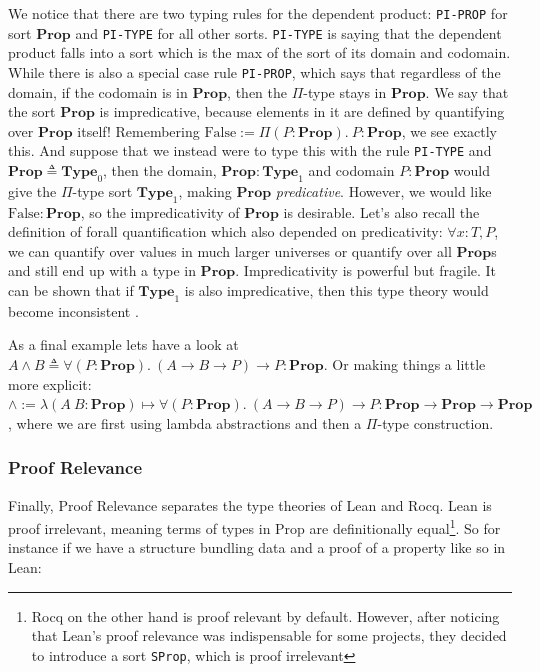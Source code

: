 We notice that there are two typing rules for the dependent product: \texttt{PI-PROP} for sort $\mathbf{Prop}$ and \texttt{PI-TYPE} for all other sorts. \texttt{PI-TYPE}
is saying that the dependent product falls into a sort which is the max of the sort of its domain and codomain. While there is also a special case rule
\texttt{PI-PROP}, which says that regardless of the domain, if the codomain is in $\mathbf{Prop}$, then the $\Pi$-type stays in $\mathbf{Prop}$.
We say that the sort $\mathbf{Prop}$ is impredicative, because elements in it are defined by quantifying over $\mathbf{Prop}$ itself! Remembering 
$\mathrm{False} := \Pi (P : \mathbf{Prop}).\ P : \mathbf{Prop}$, we see exactly this. And suppose that we instead were to type this with the rule \texttt{PI-TYPE} and
$\mathbf{Prop} \triangleq \mathbf{Type}_0$, then the
domain, $\mathbf{Prop} : \mathbf{Type}_1$ and codomain $P : \mathbf{Prop}$ would give the $\Pi$-type sort $\mathbf{Type}_1$, making $\mathbf{Prop}$ \emph{predicative}. However, we would like $\mathrm{False} : \mathbf{Prop}$,
so the impredicativity of $\mathbf{Prop}$ is desirable. Let's also recall the definition of forall quantification which also depended on predicativity: $\forall x : T, P$,
we can quantify over values in much larger universes or quantify over all $\mathbf{Prop}$s and still end up with a type in $\mathbf{Prop}$. Impredicativity is powerful but fragile.
It can be shown that if $\mathbf{Type}_1$ is also impredicative, then this type theory would become inconsistent \citep{coquand}.

As a final example lets have a look at $A \wedge B \triangleq \forall (P : \mathbf{Prop}).\ (A \to B \to P) \to P : \mathbf{Prop}$. Or making things a little more explicit:
$\wedge := \lambda (A\ B : \mathbf{Prop}) \mapsto \forall (P : \mathbf{Prop}).\ (A \to B \to P) \to P : \mathbf{Prop} \to \mathbf{Prop} \to \mathbf{Prop}$, where we are first using lambda abstractions and then a $\Pi$-type construction.

\subsubsection{Proof Relevance}
Finally, Proof Relevance separates the type theories of Lean and Rocq. Lean is proof irrelevant, meaning terms of types in Prop are definitionally
equal\footnote{Rocq on the other hand is proof relevant by default. However, after noticing that Lean's proof relevance was indispensable for some projects,
they decided to introduce a sort \texttt{SProp}, which is proof irrelevant}. So
for instance if we have a structure bundling data and a proof of a property like so in Lean:

